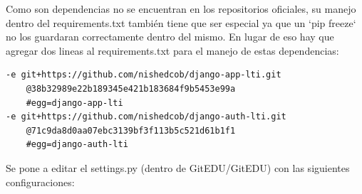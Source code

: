 Como son dependencias no se encuentran en los repositorios oficiales, su manejo dentro del requirements.txt también tiene que ser especial ya que un `pip freeze` no los guardaran correctamente dentro del mismo. En lugar de eso hay que agregar dos lineas al requirements.txt para el manejo de estas dependencias:
\begin{lstlisting}
-e git+https://github.com/nishedcob/django-app-lti.git
    @38b32989e22b189345e421b183684f9b5453e99a
    #egg=django-app-lti
-e git+https://github.com/nishedcob/django-auth-lti.git
    @71c9da8d0aa07ebc3139bf3f113b5c521d61b1f1
    #egg=django-auth-lti
\end{lstlisting}


\lstset{language=Python}

Se pone a editar el settings.py (dentro de GitEDU/GitEDU) con las siguientes configuraciones:
